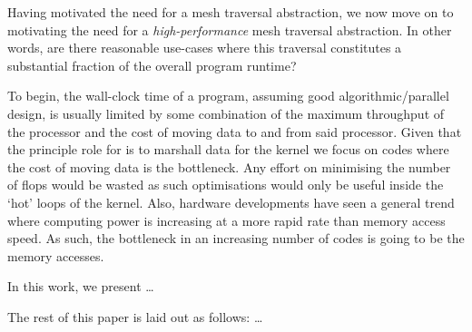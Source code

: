 Having motivated the need for a mesh traversal abstraction, we now move on to motivating the need for a \textit{high-performance} mesh traversal abstraction.
In other words, are there reasonable use-cases where this traversal constitutes a substantial fraction of the overall program runtime?

To begin, the wall-clock time of a program, assuming good algorithmic/parallel design, is usually limited by some combination of the maximum throughput of the processor and the cost of moving data to and from said processor.
Given that the principle role for \projectname is to marshall data for the kernel we focus on codes where the cost of moving data is the bottleneck.
Any effort on minimising the number of \glspl{flop} would be wasted as such optimisations would only be useful inside the `hot' loops of the kernel.
Also, hardware developments have seen a general trend where computing power is increasing at a more rapid rate than memory access speed.
As such, the bottleneck in an increasing number of codes is going to be the memory accesses.

In this work, we present \projectname\dots



The rest of this paper is laid out as follows: \dots
